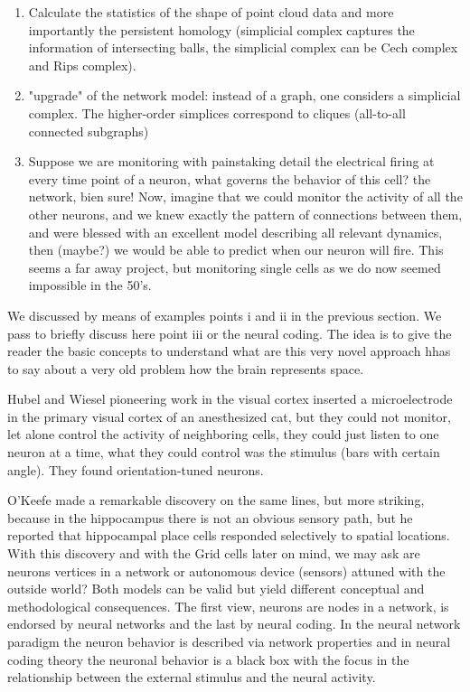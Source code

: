 \documentclass[onecollarge,runningheads]{svjour2}
\begin{document}
\begin{enumerate}
\item  Calculate the statistics of the shape of point cloud data and more importantly the persistent homology (simplicial complex captures the information of intersecting balls, the simplicial complex can be Cech complex and Rips complex).
\item  "upgrade" of the network model: instead of a graph, one considers a simplicial complex. The higher-order simplices correspond to cliques (all-to-all connected subgraphs)
\item Suppose we are monitoring with painstaking detail the electrical firing at every time point of a neuron, what governs the behavior of this cell? the network, bien sure!  Now, imagine that we could monitor the activity of all the other neurons, and we knew exactly the pattern of connections between them, and were blessed with an excellent model describing all relevant dynamics, then (maybe?) we would be able to predict when our neuron will fire. This seems a far away project, but monitoring  single cells as we do now seemed impossible in the 50's. %
\end{enumerate}

We discussed by means of examples points i and ii in the previous section. We pass to briefly  discuss here point iii or the neural coding. The idea is to give the reader the basic concepts  to understand what are this very novel approach hhas to say about a very old problem how the brain represents space.

Hubel and Wiesel pioneering work in the visual cortex inserted a microelectrode in the primary visual cortex of an anesthesized cat, but they could not monitor, let alone control the activity of neighboring cells, they could just listen to one neuron at a time, what they could control was the stimulus (bars with certain angle). They found orientation-tuned neurons.

O'Keefe made a remarkable discovery on the same lines, but more striking, because in the hippocampus there is not an obvious sensory path, but he reported that hippocampal place cells responded selectively to spatial locations.
With this discovery and with the Grid cells later on mind, we may ask are neurons vertices in a network or autonomous device (sensors) attuned with the outside world? Both models can be valid but yield different conceptual and methodological consequences. The first view, neurons are nodes in a network, is endorsed by neural networks and the last by neural coding. In the neural network paradigm the neuron behavior is described via network properties and in neural coding theory the neuronal behavior is a black box with the focus in the relationship between the external stimulus and the neural activity.
\end{document}
